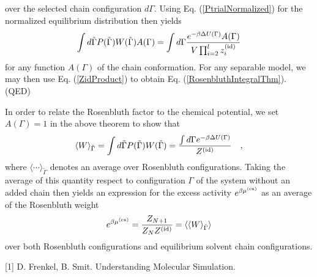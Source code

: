 \documentclass[12pt]{article} %
\newcommand\chain{\Gamma}
\newcommand\delU{\Delta U}
\newcommand\Ztot{Z_{N+1}}
\newcommand\Zsystem{Z_{N}}
\newcommand\Zid{Z^{({\rm id})}}
\newcommand\muex{\mu^{({\rm ex})}}
\newcommand\nbead{l}
\newcommand\zid{z^{({\rm id})}}
\newcommand\rconfig{\tilde{\chain}}
\begin{document}
over the selected chain configuration $d\chain$. Using Eq. (\ref{PtrialNormalized})
for the normalized equilibrium distribution then yields
\begin{equation}
    \int d\rconfig P(\rconfig)W(\rconfig) A(\chain) = 
    \int d\chain \frac{e^{-\beta\delU(\chain)}A(\chain)}{ V\prod_{i=2}^{\nbead}\zid_{i}}
\end{equation}
for any function $A(\chain)$ of the chain conformation. For any separable model,
we may then use Eq.  (\ref{ZidProduct}) to obtain Eq. (\ref{RosenbluthIntegralThm}).
(QED)

In order to relate the Rosenbluth factor to the chemical potential, we set $A(\Gamma)=1$
in the above theorem to show that
\begin{equation}
    \langle W \rangle_{\rconfig} = \int d\rconfig P(\rconfig)W(\rconfig) = 
    \frac{\int d\chain e^{-\beta\delU(\chain)}}{\Zid} 
    \quad,
\end{equation}
where $\langle \cdots \rangle_{\rconfig}$ denotes an average over Rosenbluth configurations.
Taking the average of this quantity respect to configuration $\Gamma$ of the system without 
an added chain then yields an expression for the excess activity $e^{\beta\muex}$ as an 
average of the Rosenbluth weight
\begin{equation}
   e^{\beta \muex} = 
   \frac{\Ztot}{\Zsystem\Zid} = 
   \langle \langle W \rangle_{\rconfig} \rangle
\end{equation}
over both Rosenbluth configurations and equilibrium solvent chain configurations. 


\begin{thebibliography}{99} %

[1] D. Frenkel, B. Smit. Understanding Molecular Simulation. 
 
\end{thebibliography}

\end{document}

